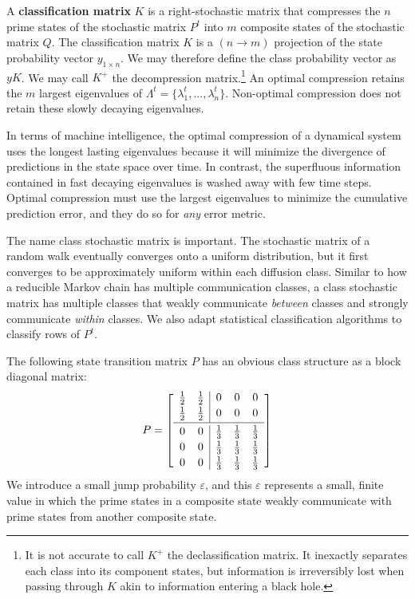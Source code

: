 \documentclass[10pt, a5paper, twoside, openright]{memoir}
\begin{document}
A \textbf{classification matrix} $K$ is a right-stochastic matrix that compresses the $n$ prime states of the stochastic matrix $P^t$ into $m$ composite states of the stochastic matrix $Q$. The classification matrix $K$ is a $(n \rightarrow m)$ projection of the state probability vector $y_{1 \times n}$. We may therefore define the class probability vector as $y K$. We may call $K^+$ the decompression matrix.\footnote{It is not accurate to call $K^+$ the declassification matrix. It inexactly separates each class into its component states, but information is irreversibly lost when passing through $K$ akin to information entering a black hole.} An optimal compression retains the $m$ largest eigenvalues of $\Lambda^t = \{\lambda_1^t,...,\lambda_n^t\}$. Non-optimal compression does not retain these slowly decaying eigenvalues.

In terms of machine intelligence, the optimal compression of a dynamical system uses the longest lasting eigenvalues because it will minimize the divergence of predictions in the state space over time. In contrast, the superfluous information contained in fast decaying eigenvalues is washed away with few time steps. Optimal compression must use the largest eigenvalues to minimize the cumulative prediction error, and they do so for \textit{any} error metric.

The name class stochastic matrix is important. The stochastic matrix of a random walk eventually converges onto a uniform distribution, but it first converges to be approximately uniform within each diffusion class. Similar to how a reducible Markov chain has multiple communication classes, a class stochastic matrix has multiple classes that weakly communicate \textit{between} classes and strongly communicate \textit{within} classes. We also adapt statistical classification algorithms to classify rows of $P^t$.

The following state transition matrix $P$ has an obvious class structure as a block diagonal matrix:
\[P= 
\left[\begin{array}{c c|c c c}
\frac{1}{2} & \frac{1}{2} & 0 & 0 & 0 \\[2pt]
\frac{1}{2} & \frac{1}{2} & 0 & 0 & 0 \\[2pt]
\hline \\[-2.3ex]
0 & 0 & \frac{1}{3} & \frac{1}{3} & \frac{1}{3} \\[2pt]
0 & 0 & \frac{1}{3} & \frac{1}{3} & \frac{1}{3} \\[2pt]
0 & 0 & \frac{1}{3} & \frac{1}{3} & \frac{1}{3}
\end{array}\right]\]
We introduce a small jump probability $\varepsilon$, and this $\varepsilon$ represents a small, finite value in which the prime states in a composite state weakly communicate with prime states from another composite state. 
\end{document}
